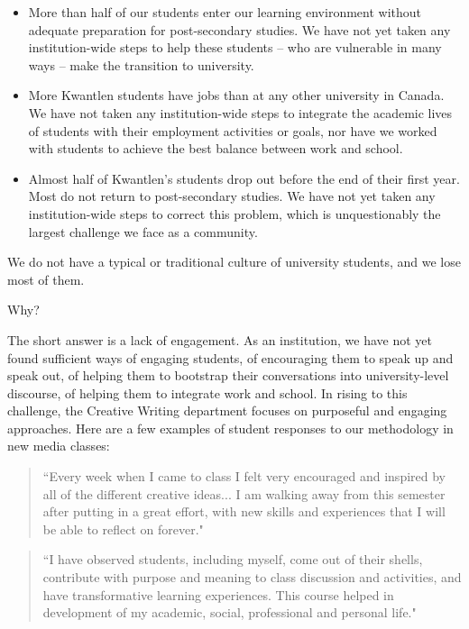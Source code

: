 \documentclass[letterpaper,10pt,headsepline]{scrreprt}
\begin{document}
\begin{itemize}

\item More than half of our students enter our learning environment without adequate preparation for post-secondary studies. We have not yet taken any institution-wide steps to help these students -- who are vulnerable in many ways -- make the transition to university.

\item More Kwantlen students have jobs than at any other university in Canada. We have not taken any institution-wide steps to integrate the academic lives of students with their employment activities or goals, nor have we worked with students to achieve the best balance between work and school.

\item Almost half of Kwantlen's students drop out before the end of their first year. Most do not return to post-secondary studies. We have not yet taken any institution-wide steps to correct this problem, which is unquestionably the largest challenge we face as a community.

\end{itemize}

We do not have a typical or traditional culture of university students, and we lose most of them.

Why?

The short answer is a lack of engagement. As an institution, we have not yet found sufficient ways of engaging students, of encouraging them to speak up and speak out, of helping them to bootstrap their conversations into university-level discourse, of helping them to integrate work and school. In rising to this challenge, the Creative Writing department focuses on purposeful and engaging approaches. Here are a few examples of student responses to our methodology in new media classes:

\begin{quotation}
``Every week when I came to class I felt very encouraged and inspired by all of the different creative ideas... I am walking away from this semester after putting in a great effort, with new skills and experiences that I will be able to reflect on forever."
\end{quotation}

\begin{quotation}
``I have observed students, including myself, come out of their shells, contribute with purpose and meaning to class discussion and activities, and have transformative learning experiences. This course helped in development of my academic, social, professional and personal life."
\end{quotation}
\end{document}
